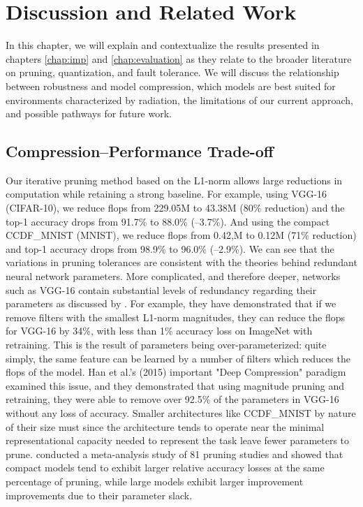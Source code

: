 \chapter{Discussion and Related Work}
\label{chap:discussion}
In this chapter, we will explain and contextualize the results presented in chapters \ref{chap:imp} and \ref{chap:evaluation} as they relate to the broader literature on pruning, quantization, and fault tolerance. We will discuss the relationship between robustness and model compression, which models are best suited for environments characterized by radiation, the limitations of our current approach, and possible pathways for future work.

\section{Compression–Performance Trade-off}

Our iterative pruning method based on the L1-norm allows large reductions in computation while retaining a strong baseline. For example, using VGG-16 (CIFAR-10), we reduce \gls{flops} from 229.05M to 43.38M (80\% reduction) and the top-1 accuracy drops from 91.7\% to 88.0\% (–3.7\%). And using the compact CCDF\_MNIST (MNIST), we reduce \gls{flops} from 0.42,M to 0.12M (71\% reduction) and top-1 accuracy drops from 98.9\% to 96.0\% (–2.9\%).
We can see that the variations in pruning tolerances are consistent with the theories behind redundant neural network parameters. More complicated, and therefore deeper, networks such as VGG-16 contain substantial levels of redundancy regarding their parameters as discussed by \cite{Li2017}. For example, they have demonstrated that if we remove filters with the smallest L1-norm magnitudes, they can reduce the \gls{flops} for VGG-16 by 34\%, with less than 1\% accuracy loss on ImageNet with retraining. This is the result of parameters being over-parameterized: quite simply, the same feature can be learned by a number of filters which reduces the \gls{flops} of the model. Han et al.'s (2015) important "Deep Compression" paradigm \cite{Han2015} examined this issue, and they demonstrated that using magnitude pruning and retraining, they were able to remove over 92.5\% of the parameters in VGG-16 without any loss of accuracy. Smaller architectures like CCDF\_MNIST by nature of their size must since the architecture tends to operate near the minimal representational capacity needed to represent the task leave fewer parameters to prune. \cite{Blalock2020} conducted a meta-analysis study of 81 pruning studies and showed that compact models tend to exhibit larger relative accuracy losses at the same percentage of pruning, while large models exhibit larger improvement improvements due to their parameter slack.

